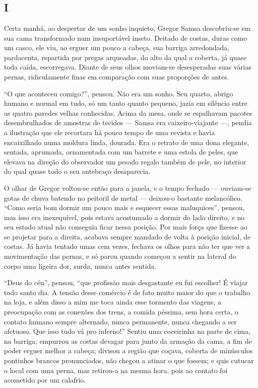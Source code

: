 \chapter*{}
\section{I}

\noindent{}Certa manhã, ao despertar de um sonho inquieto, Gregor Samsa descobriu-se
em sua cama transformado num insuportável inseto. Deitado de costas, duras
como um casco, ele viu, ao erguer um pouco a cabeça, sua barriga arredondada,
pardacenta, repartida por pregas arqueadas, do alto da qual a coberta, já
quase toda caída, escorregava. Diante de seus olhos moviam-se
desesperadas suas várias pernas, ridiculamente finas em comparação com
suas proporções de antes.

“O que aconteceu comigo?”, pensou. Não era um sonho. Seu quarto, abrigo
humano e normal em tudo, só um tanto quanto pequeno, jazia em silêncio
entre as quatro paredes velhas conhecidas. Acima da mesa, onde se
espalhavam pacotes desembrulhados de amostras de tecidos --- Samsa era
caixeiro-viajante ---, pendia a ilustração que ele recortara há pouco tempo
de uma revista e havia encaixilhado numa moldura linda, dourada. Era o
retrato de uma dona elegante, sentada, aprumada, ornamentada com um
barrete e uma estola de peles, que elevava na direção do observador um
pesado regalo também de pele, no interior do qual quase todo o seu
antebraço desaparecia.

O olhar de Gregor voltou-se então para a janela, e o tempo fechado ---
ouviam-se gotas de chuva batendo no peitoril de metal --- deixou-o bastante
melancólico. “Como seria bom dormir um pouco mais e esquecer
essas maluquices”, pensou, mas isso era inexequível, pois estava
acostumado a dormir do lado direito, e no seu estado atual não conseguia
ficar nessa posição. Por mais força que fizesse ao se projetar para a
direita, acabava sempre mandado de volta à posição inicial, de costas. Já
havia tentado umas cem vezes, fechava os olhos para não ter que ver a
movimentação das pernas, e só parou quando começou a sentir na
lateral do corpo uma
ligeira dor, surda, nunca antes sentida.

“Deus do céu”, pensou, “que profissão mais desgastante eu fui escolher! É
viajar todo santo dia. A tensão desse comércio é de fato muito maior do
que o trabalho na loja, e além disso a mim me toca ainda esse tormento das
viagens, a preocupação com as conexões dos trens, a comida péssima, sem
hora certa, o contato humano sempre alternado, nunca permanente, nunca
chegando a ser afetuoso. Que isso tudo vá pro inferno!” Sentiu uma
coceirinha na parte de cima, na barriga; empurrou as costas devagar para
junto da armação da cama, a fim de poder erguer melhor a cabeça; divisou a
região que coçava, coberta de minúsculos pontinhos brancos pronunciados,
não chegou a atinar o que fossem; e quis cutucar o local com uma perna,
mas retirou-a na mesma hora, pois ao contato foi acometido por um
calafrio.

